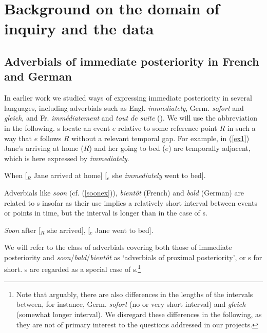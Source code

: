 
\section{Background on the domain of inquiry and the data}\label{sec:Background}

\subsection{Adverbials of immediate posteriority in French and German}\label{sec:IPs}

In earlier work we studied ways of expressing immediate posteriority
in several languages, including adverbials such as
Engl. \textit{immediately}, Germ. \textit{sofort} and \mbox{\textit{gleich}}, and
Fr. \textit{immédiatement} and \textit{tout de suite}
(\citealt{Atayanetal2019,GastAtayan2019,Gastetal2019,Atayan2021b,Atayan2021a}).
We will use the abbreviation \qual{\ipadv} in the following.  \ipadv s
locate an event $e$ relative to some reference point $R$ in such a way
that $e$ follows $R$ without a relevant temporal gap.  For example, in
({\ref{ex1}}) Jane's arriving at home ($R$) and her going to bed ($e$)
are temporally adjacent, which is here expressed by
\textit{immediately}.

\begin{exe}
  \ex\label{ex1} When [$_R$ Jane arrived at home] [$_e$ she
  \textit{immediately} went to bed].
\end{exe}
%
Adverbials like \textit{soon} (cf. (\ref{soonex})), \textit{bientôt} (French) and \textit{bald} (German)
are related to \ipadv s insofar as their use implies a relatively
short interval between events or points in time, but the interval
is longer than in the case of \ipadv s.
%

\begin{exe}
  \ex\label{soonex} \textit{Soon} after [$_R$ she arrived], [$_e$ Jane went to bed].
\end{exe}
%
We will refer to the class of adverbials covering both those of
immediate posteriority and \textit{soon}/\textit{bald}/\textit{bientôt}
as `adverbials of proximal posteriority', or \pradv s for
short. \ipadv s are regarded as a special case of \pradv s.\footnote{Note that
arguably, there are also differences in the lengths of the intervals
between, for instance, Germ. \textit{sofort} (no or very short interval) and
\textit{gleich} (somewhat longer interval). We disregard these
differences in the following, as they are not of primary interest to
the questions addressed in our projects.}



